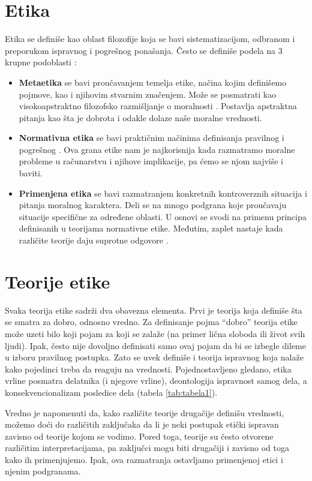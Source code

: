 \documentclass[a4paper]{article}
\begin{document}
\section{Etika}
Etika se definiše kao oblast filozofije koja se bavi sistematizacijom, odbranom i preporukom ispravnog i pogrešnog ponašanja. Često se definiše podela na 3 krupne podoblasti \cite{ethics-iep}:

\begin{itemize}
	\item \textbf{Metaetika} se bavi proučavanjem temelja etike, načina kojim definišemo pojmove, kao i njihovim stvarnim značenjem. Može se posmatrati kao visokoapstraktno filozofsko razmišljanje o moralnosti \cite{metaethics-iep}. Postavlja apstraktna pitanja kao šta je dobrota i odakle dolaze naše moralne vrednosti.
	\item \textbf{Normativna etika} se bavi praktičnim načinima definisanja pravilnog i pogrešnog \cite{ethics-iep}. Ova grana etike nam je najkorisnija kada razmatramo moralne probleme u računarstvu i njihove implikacije, pa ćemo se njom najviše i baviti. 
	\item \textbf{Primenjena etika} se bavi razmatranjem konkretnih kontroverznih situacija i pitanja moralnog karaktera. Deli se na mnogo podgrana koje proučavaju situacije specifične za određene oblasti. U osnovi se svodi na primenu principa definisanih u teorijama normativne etike. Međutim, zaplet nastaje kada različite teorije daju suprotne odgovore \cite{ethics-iep}. 
\end{itemize}

\section{Teorije etike}
Svaka teorija etike sadrži dva obavezna elementa. Prvi je teorija koja definiše šta se smatra za dobro, odnosno vredno. Za definisanje pojma ``dobro'' teorija etike može uzeti bilo koji pojam za koji se zalaže (na primer lična sloboda ili život svih ljudi). Ipak, često nije dovoljno definisati samo ovaj pojam da bi se izbegle dileme u izboru pravilnog postupka. Zato se uvek definiše i teorija ispravnog koja nalaže kako pojedinci treba da reaguju na vrednosti. Pojednostavljeno gledano, etika vrline posmatra delatnika (i njegove vrline), deontologija ispravnost samog dela, a konsekvencionalizam posledice dela (tabela \ref{tab:tabela1}). 

Vredno je napomenuti da, kako različite teorije drugačije definišu vrednosti, možemo doći do različitih zaključaka da li je neki postupak etički ispravan zavisno od teorije kojom se vodimo. Pored toga, teorije su često otvorene različitim interpretacijama, pa zaključci mogu biti drugačiji i zavisno od toga kako ih primenjujemo. Ipak, ova razmatranja ostavljamo primenjenoj etici i njenim podgranama. 
\end{document}
